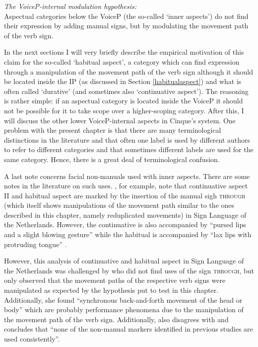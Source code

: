 \begin{exe}
\ex \textit{The VoiceP-internal modulation hypothesis:}\\
Aspectual categories below the VoiceP (the so-called `inner aspects') do not find their expression by adding manual signs, but by modulating the movement path of the verb sign. \label{vpinternalmodhypa}
\end{exe}


\noindent In the next sections I will very briefly describe the empirical motivation of this claim for the so-called `habitual aspect', a category which can find expression through a manipulation of the movement path of the verb sign although it should be located inside the IP (as discussed in Section \ref{habitualaspect}) and what is often called `durative' (and sometimes also `continuative aspect'). The reasoning is rather simple: if an aspectual category is located inside the VoiceP it should not be possible for it to take scope over a higher-scoping category. After this, I will discuss the other lower VoiceP-internal aspects in Cinque's system. One problem with the present chapter is that there are many terminological distinctions in the literature and that often one label is used by different authors to refer to different categories and that sometimes different labels are used for the same category. Hence, there is a great deal of terminological confusion. 

A last note concerns facial non-manuals used with inner aspects. There are some notes in the literature on such uses. \citet{hoitingslobin2001typological}, for example, note that continuative aspect II and habitual aspect are marked by the insertion of the manual sigh \textsc{through} (which itself shows manipulations of the movement path similar to the ones described in this chapter, namely reduplicated movements) in Sign Language of the Netherlands. However, the continuative is also accompanied by ``pursed lips and a slight blowing gesture'' while the habitual is accompanied by ``lax lips with protruding tongue'' \citep[127]{hoitingslobin2001typological}. 

However, this analysis of continuative and habitual aspect in Sign Language of the Netherlands was challenged by \citet{oomen2016aspectual} who did not find uses of the sign \textsc{through}, but only observed that the movement paths of the respective verb signs were manipulated as expected by the hypothesis put to test in this chapter. Additionally, she found ``synchronous back-and-forth movement of the head or body'' \citep[43]{oomen2016aspectual} which are probably performance phenomena due to the manipulation of the movement path of the verb sign. Additionally, \citet[17]{boven2018throughaspect} also disagrees with \citet{hoitingslobin2001typological} and concludes that ``none of the non-manual markers identified in previous studies are  used  consistently''.%


